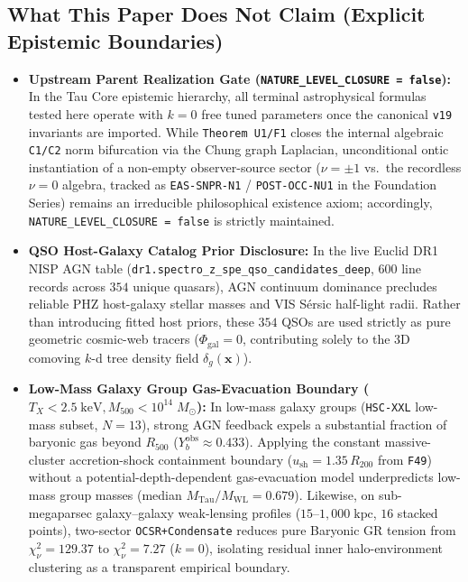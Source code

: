 \documentclass[11pt,a4paper]{article}
\begin{document}
\subsection{What This Paper Does Not Claim (Explicit Epistemic Boundaries)}
\begin{itemize}
  \item \textbf{Upstream Parent Realization Gate (\texttt{NATURE\_LEVEL\_CLOSURE = false}):} In the Tau Core epistemic hierarchy, all terminal astrophysical formulas tested here operate with $k = 0$ free tuned parameters once the canonical \texttt{v19} invariants are imported. While \texttt{Theorem U1/F1} closes the internal algebraic \texttt{C1/C2} norm bifurcation via the Chung graph Laplacian, unconditional ontic instantiation of a non-empty observer-source sector ($\nu = \pm 1$ vs.\ the recordless $\nu = 0$ algebra, tracked as \texttt{EAS-SNPR-N1} / \texttt{POST-OCC-NU1} in the Foundation Series) remains an irreducible philosophical existence axiom; accordingly, \texttt{NATURE\_LEVEL\_CLOSURE = false} is strictly maintained.
  \item \textbf{QSO Host-Galaxy Catalog Prior Disclosure:} In the live Euclid DR1 NISP AGN table (\texttt{dr1.\allowbreak spectro\_\allowbreak z\_\allowbreak spe\_\allowbreak qso\_\allowbreak candidates\_\allowbreak deep}, $600$ line records across $354$ unique quasars), AGN continuum dominance precludes reliable PHZ host-galaxy stellar masses and VIS S\'ersic half-light radii. Rather than introducing fitted host priors, these $354$ QSOs are used strictly as pure geometric cosmic-web tracers ($\Phi_{\mathrm{gal}} = 0$, contributing solely to the 3D comoving $k$-d tree density field $\delta_g(\mathbf{x})$).
  \item \textbf{Low-Mass Galaxy Group Gas-Evacuation Boundary ($T_X < 2.5\;\mathrm{keV}, M_{500} < 10^{14}\;M_\odot$):} In low-mass galaxy groups (\texttt{HSC-XXL} low-mass subset, $N = 13$), strong AGN feedback expels a substantial fraction of baryonic gas beyond $R_{500}$ ($Y_b^{\mathrm{obs}} \approx 0.433$). Applying the constant massive-cluster accretion-shock containment boundary ($u_{\mathrm{sh}} = 1.35\,R_{200}$ from \texttt{F49}) without a potential-depth-dependent gas-evacuation model underpredicts low-mass group masses (median $M_{\mathrm{Tau}}/M_{\mathrm{WL}} = 0.679$). Likewise, on sub-megaparsec galaxy--galaxy weak-lensing profiles ($15\text{--}1,000\;\mathrm{kpc}$, $16$ stacked points), two-sector \texttt{OCSR+Condensate} reduces pure Baryonic GR tension from $\chi^2_\nu = 129.37$ to $\chi^2_\nu = 7.27$ ($k=0$), isolating residual inner halo-environment clustering as a transparent empirical boundary.

\end{itemize}
\end{document}
